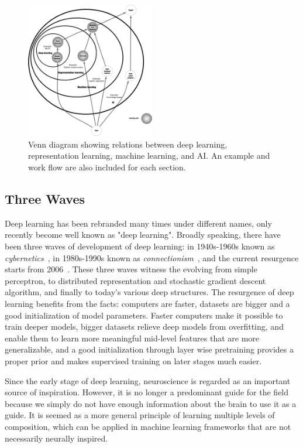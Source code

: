 \begin{figure}[t]
    \centering
    \includegraphics[width=0.5\textwidth]{figure/ch3-dlrelation.pdf}
    \caption{Venn diagram showing relations between deep learning, representation learning, machine learning, and AI. An example and work flow are also included for each section.}
    \label{fig:ch3-dlrelation}
\end{figure}

\subsection{Three Waves}
Deep learning has been rebranded many times under different names, only recently become well known as "deep learning". Broadly speaking, there have been three waves of development of deep learning: in 1940s-1960s known as \emph{cybernetics}~\cite{hebb2005organization, rosenblatt1958perceptron}, in 1980s-1990s known as \emph{connectionism}~\cite{rumelhart1985learning}, and the current resurgence starts from 2006~\cite{Hinton:2006:FLA,hinton2006reducing,Bengio07greedylayer-wise}. These three waves witness the evolving from simple perceptron, to distributed representation and stochastic gradient descent algorithm, and finally to today's various deep structures. The resurgence of deep learning benefits from the facts: computers are faster, datasets are bigger and a good initialization of model parameters. Faster computers make it possible to train deeper models, bigger datasets relieve deep models from overfitting, and enable them to learn more meaningful mid-level features that are more generalizable, and a good initialization through layer wise pretraining provides a proper prior and makes supervised training on later stages much easier.

Since the early stage of deep learning, neuroscience is regarded as an important source of inspiration. However, it is no longer a predominant guide for the field because we simply do not have enough information about the brain to use it as a guide. It is seemed as a more general principle of learning multiple levels of composition, which can be applied in machine learning frameworks that are not necessarily neurally inspired.


